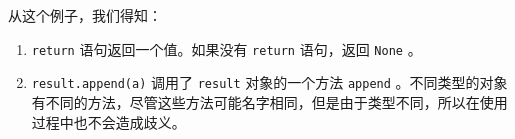 \documentclass[10pt,a4paper,UTF8]{article}
\begin{document}
从这个例子，我们得知：
\begin{enumerate}
\item \texttt{return} 语句返回一个值。如果没有 \texttt{return} 语句，返回 \texttt{None} 。
\item \texttt{result.append(a)}  调用了 \texttt{result} 对象的一个方法 \texttt{append} 。不同类型的对象有不同的方法，尽管这些方法可能名字相同，但是由于类型不同，所以在使用过程中也不会造成歧义。
\end{enumerate}
\end{document}
